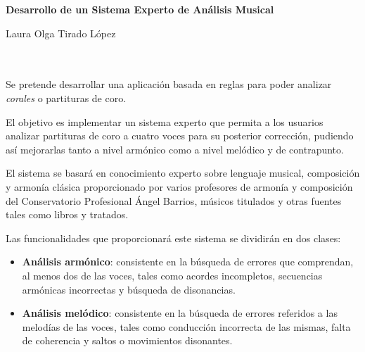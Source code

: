 \documentclass[a4paper, 12pt]{report} %
\makeatletter
\numberwithin{equation}{section} %
\numberwithin{figure}{section} %
\numberwithin{table}{section} %
\newcommand\frontmatter{%
    \cleardoublepage
  \pagenumbering{roman}}
\makeatother
\begin{document}

\newpage


\frontmatter

\thispagestyle{empty}

\begin{center}
{\large\bfseries Desarrollo de un Sistema Experto de Análisis Musical}\\
\end{center}
\begin{center}
Laura Olga Tirado López\\
\end{center}

\\

\vspace{0.7cm}
\\

Se pretende desarrollar una aplicación basada en reglas para poder analizar \textit{corales} o partituras de coro.

\bigskip

El objetivo es implementar un sistema experto que permita a los usuarios analizar partituras de coro a cuatro voces para su posterior corrección, pudiendo así mejorarlas tanto a nivel armónico como a nivel melódico y de contrapunto.

\bigskip

El sistema se basará en conocimiento experto sobre lenguaje musical, composición y armonía clásica proporcionado por varios profesores de armonía y composición del Conservatorio Profesional Ángel Barrios, músicos titulados y otras fuentes tales como libros y tratados. 

\bigskip

Las funcionalidades que proporcionará este sistema se dividirán en dos clases:

\begin{itemize}
	\item \textbf{Análisis armónico}: consistente en la búsqueda de errores que comprendan, al menos dos de las voces, tales como acordes incompletos, secuencias armónicas incorrectas y búsqueda de disonancias.
	\item  \textbf{Análisis melódico}: consistente en la búsqueda de errores referidos a las melodías de las voces, tales como conducción incorrecta de las mismas, falta de coherencia y saltos o movimientos disonantes. 
\end{itemize}
\end{document}
